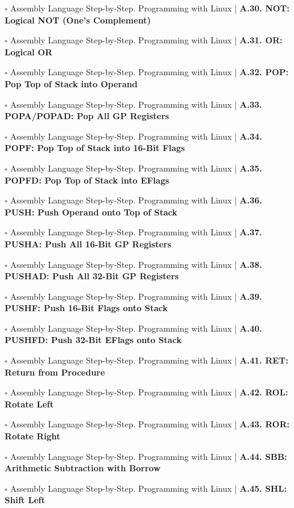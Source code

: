 \documentclass[a4, landscape, 12pt]{article}
\newcommand{\checkbox}{$\square$}%
\begin{document}
\begin{itemize}
{}
\item [\checkbox]  Assembly Language Step-by-Step. Programming with Linux | \textbf{ A.30. NOT: Logical NOT (One's Complement)
}
\item [\checkbox]  Assembly Language Step-by-Step. Programming with Linux | \textbf{ A.31. OR: Logical OR
}
\item [\checkbox]  Assembly Language Step-by-Step. Programming with Linux | \textbf{ A.32. POP: Pop Top of Stack into Operand
}
\item [\checkbox]  Assembly Language Step-by-Step. Programming with Linux | \textbf{ A.33. POPA/POPAD: Pop All GP Registers
}
\item [\checkbox]  Assembly Language Step-by-Step. Programming with Linux | \textbf{ A.34. POPF: Pop Top of Stack into 16-Bit Flags
}
\item [\checkbox]  Assembly Language Step-by-Step. Programming with Linux | \textbf{ A.35. POPFD: Pop Top of Stack into EFlags
}
\item [\checkbox]  Assembly Language Step-by-Step. Programming with Linux | \textbf{ A.36. PUSH: Push Operand onto Top of Stack
}
\item [\checkbox]  Assembly Language Step-by-Step. Programming with Linux | \textbf{ A.37. PUSHA: Push All 16-Bit GP Registers
}
\item [\checkbox]  Assembly Language Step-by-Step. Programming with Linux | \textbf{ A.38. PUSHAD: Push All 32-Bit GP Registers
}
\item [\checkbox]  Assembly Language Step-by-Step. Programming with Linux | \textbf{ A.39. PUSHF: Push 16-Bit Flags onto Stack
}
\item [\checkbox]  Assembly Language Step-by-Step. Programming with Linux | \textbf{ A.40. PUSHFD: Push 32-Bit EFlags onto Stack
}
\item [\checkbox]  Assembly Language Step-by-Step. Programming with Linux | \textbf{ A.41. RET: Return from Procedure
}
\item [\checkbox]  Assembly Language Step-by-Step. Programming with Linux | \textbf{ A.42. ROL: Rotate Left
}
\item [\checkbox]  Assembly Language Step-by-Step. Programming with Linux | \textbf{ A.43. ROR: Rotate Right
}
\item [\checkbox]  Assembly Language Step-by-Step. Programming with Linux | \textbf{ A.44. SBB: Arithmetic Subtraction with Borrow
}
\item [\checkbox]  Assembly Language Step-by-Step. Programming with Linux | \textbf{ A.45. SHL: Shift Left
}
\end{itemize}
\end{document}
